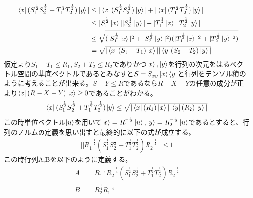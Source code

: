 \documentclass[a4paper,10.5pt]{article}
\numberwithin{equation}{section}
\begin{document}
\begin{equation}\begin{split}
   |\bra{x}(S_{1}^{\frac{1}{2}}S_{2}^{\frac{1}{2}}+T_{1}^{\frac{1}{2}}T_{2}^{\frac{1}{2}})\ket{y}|
   &\leq |\bra{x}(S_{1}^{\frac{1}{2}}S_{2}^{\frac{1}{2}})\ket{y}|+|\bra{x}(T_{1}^{\frac{1}{2}}T_{2}^{\frac{1}{2}})\ket{y}|\\
   &\leq |S_{1}^{\frac{1}{2}}\ket{x}||S_{2}^{\frac{1}{2}}\ket{y}|+
   |T_{1}^{\frac{1}{2}}\ket{x}||T_{2}^{\frac{1}{2}}\ket{y}|\\
   &\leq \sqrt{(|S_{1}^{\frac{1}{2}}\ket{x}|^{2}+|S_{2}^{\frac{1}{2}}\ket{y}|^{2})
            (|T_{1}^{\frac{1}{2}}\ket{x}|^{2}+|T_{2}^{\frac{1}{2}}\ket{y}|^{2})}\\
    &=\sqrt{|\bra{x}(S_{1}+T_{1})\ket{x}||\bra{y}(S_{2}+T_{2})\ket{y}|}
\end{split} \end{equation}
仮定より$S_{1}+T_{1}\leq R_{1},S_{2}+T_{2}\leq R_{2}$でありかつ$\ket{x},\ket{y}$を行列の次元をはるベクトル空間の基底ベクトルであるとみなすと$S=S_{xy}\ket{x}\bra{y}$と行列をテンソル積のように考えることが出来る。$S+Y\leq R$であるなら$R-X-Y$の任意の成分が正より$\bra{x}(R-X-Y)\ket{x}\geq 0$であることがわかる。
\begin{equation}\begin{split}
    \bra{x}(S_{1}^{\frac{1}{2}}S_{2}^{\frac{1}{2}}+T_{1}^{\frac{1}{2}}T_{2}^{\frac{1}{2}})\ket{y}
    \leq \sqrt{|\bra{x}(R_{1})\ket{x}||\bra{y}(R_{2})\ket{y}|}
\end{split} \end{equation}
この時単位ベクトル$\ket{u}$を用いて$\ket{x}=R_{1}^{-\frac{1}{2}}\ket{u},\ket{y}=R_{2}^{-\frac{1}{2}}\ket{u}$であるとすると、行列のノルムの定義を思い出すと最終的に以下の式が成立する。
\begin{equation}\begin{split}
     ||R_{1}^{-\frac{1}{2}}(S_{1}^{\frac{1}{2}}S_{2}^{\frac{1}{2}}+T_{1}^{\frac{1}{2}}T_{2}^{\frac{1}{2}})R_{2}^{-\frac{1}{2}}||\leq 1
\end{split} \end{equation}
この時行列A,Bを以下のように定義する。
\begin{equation}\begin{split}
    A&=R_{1}^{-\frac{1}{4}}R_{2}^{-\frac{1}{4}}(S_{1}^{\frac{1}{2}}S_{2}^{\frac{1}{2}}+T_{1}^{\frac{1}{2}}T_{2}^{\frac{1}{2}})R_{2}^{-\frac{1}{2}}\\
    B&=R_{2}^{\frac{1}{4}}R_{1}^{-\frac{1}{4}}
\end{split} \end{equation}
\end{document}
